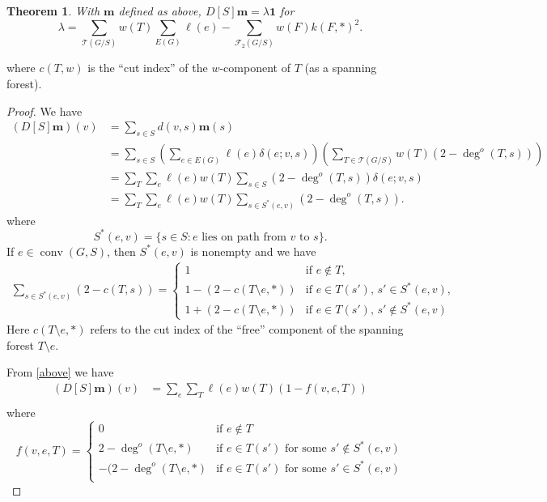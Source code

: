 \documentclass{amsart}
\newtheorem{thm}{Theorem}
\theoremstyle{definition}
\DeclareMathOperator{\conv}{conv}
\newcommand{\trees}{\mathcal{T}}
\newcommand{\forests}{\mathcal{F}}
\begin{document}
\begin{thm}
With $\mathbf{m}$ defined as above,
$D[S] \mathbf{m} = \lambda \mathbf{1}$
for 
\begin{equation}
\lambda = \sum_{\trees(G/S)} w(T) \sum_{E(G)} \ell(e) - \sum_{\forests_2(G/S)} w(F) k(F,*)^2 .
\end{equation}
\end{thm}
where $c(T,w)$ is the ``cut index'' of the $w$-component of $T$ (as a spanning forest).
\begin{proof}
We have
\begin{align*}
 (D[S] \mathbf{m})(v) &= \sum_{s \in S} d(v,s) \mathbf{m}(s) \\
 &= \sum_{s \in S} \left( \sum_{e \in E(G)} \ell(e) \delta(e; v,s) \right) \left( \sum_{T \in \mathcal T(G/S)} w(T) (2 - \deg^o(T,s)) \right) \\
 &= \sum_{T } \sum_{e} \ell(e) w(T) \sum_{s \in S} (2 - \deg^o(T, s)) \delta(e; v,s) \\
 &= \sum_{T } \sum_{e} \ell(e) w(T) \sum_{s \in S^*(e,v)} (2 - \deg^o(T, s)) .
\end{align*}
where
$$
S^*(e,v) = \{ s \in S : \text{$e$ lies on path from $v$ to $s$}\}.
$$
If $e \in \conv(G,S)$, then $S^*(e,v)$ is nonempty and we have
\begin{align*}
\sum_{s \in S^*(e,v)}(2 - c(T,s)) = \begin{cases}
1 &\text{if }e \not \in T, \\
1 - (2 - c(T \setminus e, *)) &\text{if } e \in T(s'),\, s'\in S^*(e,v) , \\
1 + (2 - c(T \setminus e, *)) &\text{if } e \in T(s'),\, s' \not\in S^*(e,v)
\end{cases}
\end{align*}
Here $c(T\setminus e, *)$ refers to the cut index of the ``free'' component of the spanning forest $T \setminus e$.

From \eqref{above} we have
\begin{align*}
(D[S] \mathbf{m})(v) &= \sum_{e} \sum_{T }  \ell(e) w(T) ( 1 - f(v,e,T) )\\
\end{align*}
where
$$
f(v,e,T) = \begin{cases}
0 &\text{if } e\not\in T\\
2 - \deg^o(T\setminus e,*) &\text{if }  e \in T(s')\text{ for some } s'\not\in S^*(e,v) \\
-(2-\deg^o(T\setminus e,*) &\text{if }  e \in T(s')\text{ for some } s'\in S^*(e,v) \\
\end{cases}
$$


\end{proof}
\end{document}
